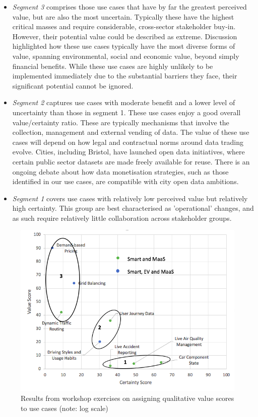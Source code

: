 \documentclass[b5paper,10pt]{article}
\begin{document}
\begin{itemize}
\item {\emph{Segment 3}} comprises those use cases that have by far
the greatest perceived value, but are also the most
uncertain. Typically these have the highest critical masses and
require considerable, cross-sector stakeholder buy-in. However, their
potential value could be described as extreme. Discussion highlighted
how these use cases typically have the most diverse forms of value,
spanning environmental, social and economic value, beyond simply
financial benefits. While these use cases are highly unlikely to be
implemented immediately due to the substantial barriers they face,
their significant potential cannot be ignored.
\item {\emph{Segment 2}} captures use cases with moderate benefit and
a lower level of uncertainty than those in segment 1. These use cases
enjoy a good overall value/certainty ratio. These are typically
mechanisms that involve the collection, management and external
vending of data. The value of these use cases will depend on how legal
and contractual norms around data trading evolve. Cities, including
Bristol, have launched open data initiatives, where certain public
sector datasets are made freely available for reuse. There is an
ongoing debate about how data monetisation strategies, such as those
identified in our use cases, are compatible with city open data
ambitions.
\item {\emph{Segment 1}} covers use cases with relatively low
perceived value but relatively high certainty. This group are best
characterised as 'operational' changes, and as such require relatively
little collaboration across stakeholder groups.
\end{itemize}

\begin{figure}[ht]
\centering
\includegraphics[width=0.75\columnwidth]{images/valuegraph.png}
\caption{Results from workshop exercises on assigning qualitative
value scores to use cases (note: log scale)}
\label{fig:valuegraph}
\end{figure}
\end{document}
